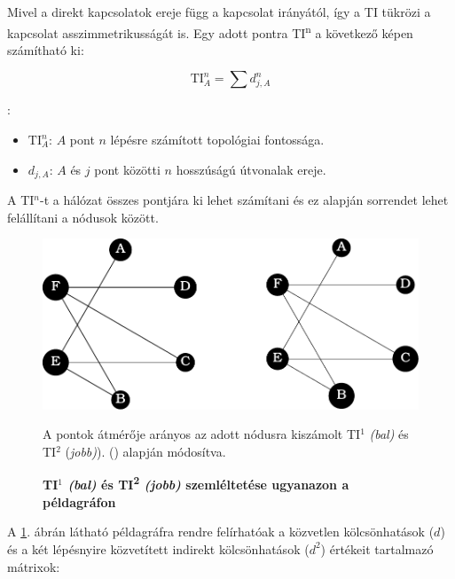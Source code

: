 \documentclass[a4paper,12pt]{article}
\begin{document}
	 Mivel a direkt kapcsolatok ereje függ a kapcsolat irányától, így a TI tükrözi a kapcsolat asszimmetrikusságát is. Egy adott pontra TI\textsuperscript{n} a következő képen számítható ki:
	 
	 \begin{equation}
		\textrm{TI}^n_A=\sum d^n_{j,A}
	 \end{equation}
	 
	 :
	 \begin{itemize}[label=]
		 \item  $\textrm{TI}^n_A$: $A$ pont $n$ lépésre számított topológiai fontossága.
		 \item  $d_{j,A}$: $A$ és $j$ pont közötti $n$ hosszúságú útvonalak ereje. 
	 \end{itemize}
	 
	A TI$^n$-t a hálózat összes pontjára ki lehet számítani és ez alapján sorrendet lehet felállítani a nódusok között.
	 
 	 \begin{figure}[H]
 		 \includegraphics[scale=1]{img/graphs.pdf}
 		 \centering
 		 \caption{\textbf{TI$^1$ \textit{(bal)} és TI\textsuperscript{2} \textit{(jobb)} szemléltetése ugyanazon a példagráfon} }
 		 A pontok átmérője arányos az adott nódusra kiszámolt TI$^1$ \textit{(bal)} és TI$^2$ (\textit{jobb)}). (\cite{ti}) alapján módosítva.
 		 \label{fig:peldagraph}
 	 \end{figure}
 	 
 	 A \ref{fig:peldagraph}. ábrán látható példagráfra rendre felírhatóak a közvetlen  kölcsönhatások ($d$) és a két lépésnyire közvetített indirekt kölcsönhatások ($d^2$) értékeit tartalmazó mátrixok:
	
\end{document}
